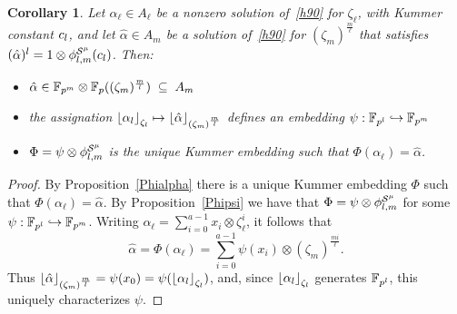\documentclass{sig-alternate}
\newtheorem{corollary}[theorem]{Corollary}
\begin{document}
\begin{corollary}
\label{alphapsi}
Let $\alpha_\ell\in A_\ell$ be a nonzero solution of~\eqref{h90} for $\zeta_\ell$,
with Kummer constant $c_l$, and
let $\hat{\alpha}\in A_m$ be a solution of~\eqref{h90} for $(\zeta_m)^{\frac{m}{\ell}}$
that satisfies $(\hat{\alpha})^l=1\otimes{\phi^{\mathcal{S}^\mu}_{{l},{m}}}(c_l)$.
Then:
\begin{itemize}
\item $\hat{\alpha}\in\mathbb{F}_{p^m}\otimes\mathbb{F}_{p}((\zeta_m)^{\frac{m}{l}})\;\subseteq\;A_m$
\item the assignation $\left\lfloor \alpha_{l} \right\rfloor_{\zeta_l}\mapsto\left\lfloor \hat{\alpha} \right\rfloor_{(\zeta_m)^{\frac{m}{l}}}$
defines an embedding $\psi:\mathbb{F}_{p^l}\hookrightarrow\mathbb{F}_{p^m}$
\item $\Phi=\psi\otimes{\phi^{\mathcal{S}^\mu}_{{l},{m}}}$ is the unique Kummer embedding such that $\Phi(\alpha_\ell)=\hat{\alpha}$.
\end{itemize}
\end{corollary}
\begin{proof}
By Proposition~\ref{Phialpha} there is a unique Kummer embedding $\Phi$ such that $\Phi(\alpha_\ell)=\hat{\alpha}$.
By Proposition~\ref{Phipsi} we have that $\Phi=\psi\otimes{\phi^{\mathcal{S}^\mu}_{{l},{m}}}$ for some $\psi:\mathbb{F}_{p^l}\hookrightarrow\mathbb{F}_{p^m}$.
Writing $\alpha_\ell=\sum_{i=0}^{a-1}x_i\otimes\zeta_{\ell}^i$,
it follows that \[ \hat{\alpha}=\Phi(\alpha_\ell)=\sum_{i=0}^{a-1}\psi(x_i)\otimes(\zeta_m)^{\frac{mi}{\ell}}. \]
Thus $\left\lfloor \hat{\alpha} \right\rfloor_{(\zeta_m)^{\frac{m}{l}}}=\psi(x_0)=\psi(\left\lfloor \alpha_{l} \right\rfloor_{\zeta_l})$,
and, since $\left\lfloor \alpha_{l} \right\rfloor_{\zeta_l}$ generates $\mathbb{F}_{p^l}$, this uniquely characterizes $\psi$.
\end{proof}
\end{document}

